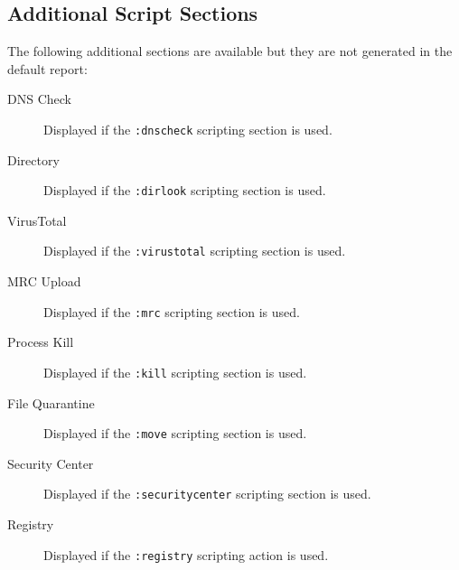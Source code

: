 \subsection{Additional Script Sections}
The following additional sections are available but they are not
generated in the default report:
\begin{description}
\item[DNS Check] Displayed if the \verb|:dnscheck| scripting section is used.
\item[Directory] Displayed if the \verb|:dirlook| scripting section is used.
\item[VirusTotal] Displayed if the \verb|:virustotal| scripting section is used.
\item[MRC Upload] Displayed if the \verb|:mrc| scripting section is used.
\item[Process Kill] Displayed if the \verb|:kill| scripting section is used.
\item[File Quarantine] Displayed if the \verb|:move| scripting section is used.
\item[Security Center] Displayed if the \verb|:securitycenter| scripting section
is used.
\item[Registry] Displayed if the \verb|:registry| scripting action is used.
\end{description}
